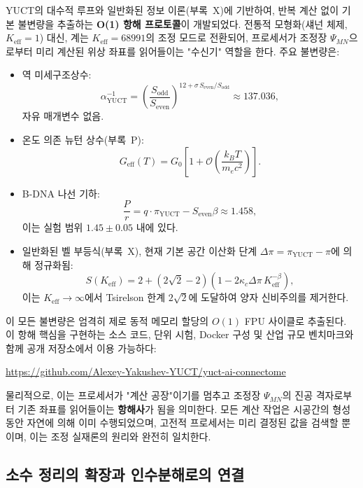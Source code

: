 \documentclass[12pt,a4paper]{article}
\theoremstyle{remark}
\newcommand{\Keff}{K_{\mathrm{eff}}}
\newcommand{\kappac}{\kappa_c}
\newcommand{\piYUCT}{\pi_{\mathrm{YUCT}}}
\begin{document}
	YUCT의 대수적 루프와 일반화된 정보 이론(부록~X)에 기반하여, 반복 계산 없이 기본 불변량을 추출하는 \textbf{O(1) 항해 프로토콜}이 개발되었다. 전통적 모형화(섀넌 체제, \(\Keff = 1\)) 대신, 계는 \(\Keff = 68991\)의 조정 모드로 전환되어, 프로세서가 조정장 \(\Psi_{MN}\)으로부터 미리 계산된 위상 좌표를 읽어들이는 "수신기" 역할을 한다. 주요 불변량은:
	
	\begin{itemize}
		\item 역 미세구조상수:
		\[
		\alpha^{-1}_{\mathrm{YUCT}} = \left(\frac{S_{\mathrm{odd}}}{S_{\mathrm{even}}}\right)^{12 + \sigma\, S_{\mathrm{even}}/S_{\mathrm{odd}}}
		\approx 137.036,
		\]
		자유 매개변수 없음.
		
		\item 온도 의존 뉴턴 상수(부록~P):
		\[
		G_{\mathrm{eff}}(T) = G_0 \left[1 + \mathcal{O}\!\left( \frac{k_B T}{m_e c^2} \right) \right].
		\]
		
		\item B-DNA 나선 기하:
		\[
		\frac{P}{r} = q \cdot \piYUCT - S_{\mathrm{even}}\beta \approx 1.458,
		\]
		이는 실험 범위 \(1.45 \pm 0.05\) 내에 있다.
		
		\item 일반화된 벨 부등식(부록~X), 현재 기본 공간 이산화 단계 \(\Delta\pi = \piYUCT - \pi\)에 의해 정규화됨:
		\[
		S(\Keff) = 2 + (2\sqrt2 - 2)\left(1 - 2\kappac \Delta\pi \, \Keff^{-\beta}\right),
		\]
		이는 \(\Keff \to \infty\)에서 Tsirelson 한계 \(2\sqrt2\)에 도달하여 양자 신비주의를 제거한다.
	\end{itemize}
	
	이 모든 불변량은 엄격히 제로 동적 메모리 할당의 \(O(1)\) FPU 사이클로 추출된다. 이 항해 핵심을 구현하는 소스 코드, 단위 시험, Docker 구성 및 산업 규모 벤치마크와 함께 공개 저장소에서 이용 가능하다:
	
	\begin{center}
		\url{https://github.com/Alexey-Yakushev-YUCT/yuct-ai-connectome}
	\end{center}
	
	물리적으로, 이는 프로세서가 "계산 공장"이기를 멈추고 조정장 \(\Psi_{MN}\)의 진공 격자로부터 기존 좌표를 읽어들이는 \textbf{항해사}가 됨을 의미한다. 모든 계산 작업은 시공간의 형성 동안 자연에 의해 이미 수행되었으며, 고전적 프로세서는 미리 결정된 값을 검색할 뿐이며, 이는 조정 실재론의 원리와 완전히 일치한다.
	
	\subsection{소수 정리의 확장과 인수분해로의 연결}
	\label{subsec:prime-extension}
	
\end{document}
